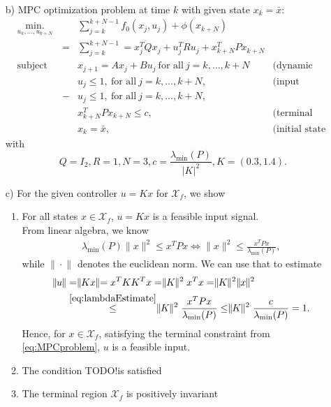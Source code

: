 \documentclass[]{article}
\newcommand{\todo}{{\color{red} TODO!}}
\newcommand{\trp}{^T}
\newcommand{\xj}{x_j}
\newcommand{\xk}{x_k}
\newcommand{\uj}{u_j}
\newcommand{\norm}[1]{\parallel \! \! #1 \! \! \parallel}
\newcommand{\xbar}{\bar{x}}
\newcommand{\X}{\mathcal{X}}
\newcommand{\lambdamin}{\lambda_{\mathrm{min}}}
\newcommand{\Xf}{\X_f}
\begin{document}
\begin{enumerate}
			\item[b)] MPC optimization problem at time $ k $ with given state $ x_k = \xbar $:
				\begin{equation}
				\begin{aligned} \label{eq:MPCproblem}
				& \underset{u_k,\dots, u_{k+N}}{\text{min.}}
				& & \sum_{j = k}^{k + N -1} f_0(\xj,\uj) + \phi(x_{k+N})\\  & & = &\sum_{j = k}^{k + N -1}  = \xj \trp Q \xj + \uj \trp R \uj + x_{k + N} \trp P x_{k + N}\\
				& \text{subject to}
				& & x_{j+1} =A \xj + B \uj \ \text{for all} \ j = k,\dots,k+N &\text{(dynamic constraints)}\\
				& & & \uj \leq 1, \ \text{for all} \ j = k,\dots,k+N, &\text{(input constraints)}\\ 
				& & -&\uj \leq 1, \ \text{for all} \ j = k,\dots,k+N,\\
				& & & x_{k+N}\trp P x_{k+N} \leq c, &\text{(terminal constraint)}\\
				& & & \xk = \xbar, &\text{(initial state constraint)}
				\end{aligned}
				\end{equation}
				with \[ Q = I_2, R = 1, N = 3, c = \frac{\lambdamin (P)}{|K|^2}, K = (0.3 , 1.4). \]
			\item[c)]
			For the given controller $ u = Kx $ for $ \Xf $, we show
				\begin{enumerate}
					\item For all states $ x \in \Xf $, $ u = Kx $ is a feasible input signal.\\
						From linear algebra, we know
						\begin{align}
							\lambdamin(P) \norm{x}^2 \leq x\trp Px \Longleftrightarrow \norm{x}^2\leq  \frac{x\trp Px}{\lambdamin(P)}, \label{eq:lambdaEstimate}
						\end{align}
						while $ \norm{\cdot} $ denotes the euclidean norm.
						We can use that to estimate
						\begin{align}
							\norm{u} &= \norm{Kx} = x\trp KK \trp x = \norm{K}^2 x\trp x = \norm{K}^2 \norm{x}^2 \\
							&\overset{\eqref{eq:lambdaEstimate}}{\leq} \norm{K}^2 \frac{x\trp Px}{\lambdamin(P)} \leq \norm{K}^2 \frac{c}{\lambdamin(P)} = 1.
						\end{align}
						Hence, for $ x\in\Xf $, satisfying the terminal constraint from \eqref{eq:MPCproblem}, $ u $ is a feasible input.
						
					\item The condition \todo  is satisfied
					\item The terminal region $ \Xf $ is positively invariant
				\end{enumerate}
			
		\end{enumerate}	
\end{document}
